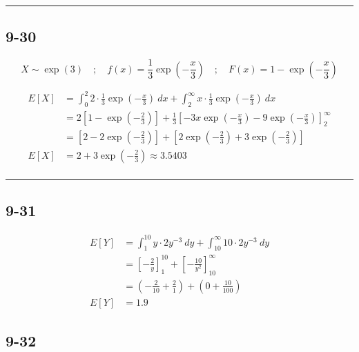 \documentclass{article}
\newcommand{\qline}{\par\noindent\rule{4.5in}{1pt}}
\begin{document}
	\qline

		\subsection*{9-30}

			\[
				X \sim \exp(3) \quad;\quad f(x) = \frac{1}{3} \exp\left( -\frac{x}{3} \right) \quad;\quad F(x) = 1 - \exp\left( -\frac{x}{3} \right)
			\]

			\begin{equation*}
				\begin{split}
					E[X] &= \int_{0}^{2} 2 \cdot \frac{1}{3} \exp\left( -\frac{x}{3} \right) \ dx + \int_{2}^{\infty} x \cdot \frac{1}{3} \exp\left( -\frac{x}{3} \right) \ dx \\
					&= 2\left[ 1 - \exp\left( -\frac{2}{3} \right) \right] + \frac{1}{3} \left[ -3x\exp\left( -\frac{x}{3} \right) - 9\exp\left( -\frac{x}{3} \right) \right]^{\infty}_2 \\
					&= \left[ 2 - 2\exp\left( -\frac{2}{3} \right) \right] + \left[ 2\exp\left( -\frac{2}{3} \right) + 3\exp\left( -\frac{2}{3} \right) \right] \\
					E[X] &= 2 + 3\exp\left( -\frac{2}{3} \right) \approx \boxed{\num{3.5403}} \\
				\end{split}
			\end{equation*}

	\qline

		\subsection*{9-31}

			\begin{equation*}
				\begin{split}
					E[Y] &= \int_{1}^{10} y \cdot 2y^{-3} \ dy + \int_{10}^{\infty} 10 \cdot 2y^{-3} \ dy \\
					&= \left[ -\frac{2}{y} \right]^{10}_1 + \left[ -\frac{10}{y^2} \right]^{\infty}_{10} \\
					&= \left( -\frac{2}{10} + \frac{2}{1} \right) + \left( 0 + \frac{10}{100} \right) \\
					E[Y] &= \boxed{\num{1.9}}
				\end{split}
			\end{equation*}

	\clearpage

		\subsection*{9-32}
\end{document}

